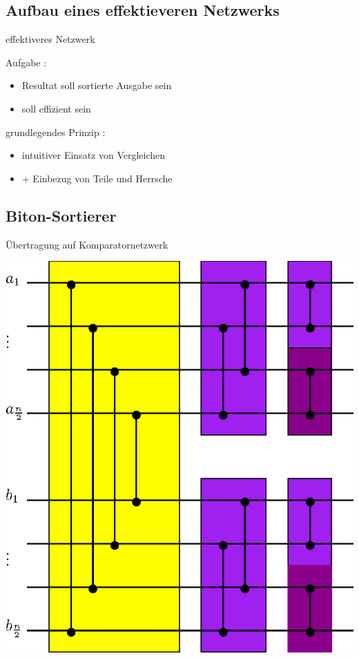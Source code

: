 \documentclass[ucs,9pt]{beamer}
\begin{document}
\subsection*{Aufbau eines effektieveren Netzwerks}
\begin{frame}{effektiveres Netzwerk}
 {Aufgabe :
            \begin{itemize}
                \item Resultat soll sortierte Ausgabe sein
                \item \alert{soll effizient sein}
            \end{itemize}}
 {grundlegendes Prinzip :
            \begin{itemize}
                \item intuitiver Einsatz von Vergleichen
                \item[]\alert{+ Einbezug von Teile und Herrsche}
            \end{itemize}}
\end{frame}

\subsection{Biton-Sortierer}
\begin{frame}{Übertragung auf Komparatornetzwerk}
\begin{center}
\includegraphics[scale=0.6]{bitonmischer.eps}
\end{center}
\end{frame}
\end{document}
